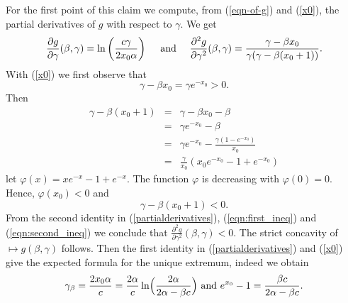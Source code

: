 \documentclass[aop,noinfoline]{imsart}
\renewcommand{\Box}{{\vrule width0.6ex height1em depth0cm}}
\newenvironment{proof}{\noindent{\bf Proof:}}{\hfill \Box}
\begin{document}
\begin{proof} 
 For the first point of this claim we compute, from (\ref{eqn-of-g}) and (\ref{x0}), the partial derivatives of $g$ with respect to $\gamma$. We get
  \begin{equation}\label{partialderivatives}
  \frac{ \partial g}{\partial\gamma}(\beta, \gamma) =
    \ln\left ( \frac{c\gamma}{2x_0\alpha}\right )\quad  \hbox{ and  } \quad  \frac{ \partial^2 g}{\partial\gamma^2} (\beta, \gamma)=
     \frac{\gamma-\beta x_0}{\gamma(\gamma - \beta(x_0+1))}.
     \end{equation}
      With  (\ref{x0}) we  first   observe that  
      \begin{equation}\label{eqn:first_ineq} \gamma-\beta
x_0=\gamma e^{-x_0}>0.
\end{equation}
Then
\begin{eqnarray*}
  \gamma-\beta (x_0+1) &=& \gamma-\beta x_0 - \beta \\
 \  &=& \gamma e^{-x_0} -\beta \\
  \  &=&  \gamma e^{-x_0} - \frac{\gamma (1-e^{-x_0})}{x_0} \\
  \  &=& \frac{\gamma}{x_0}(x_0e^{-x_0} -1+ e^{-x_0})
\end{eqnarray*}
let $\varphi(x)= xe^{-x} -1+ e^{-x}$. The function $\varphi$ is
decreasing with $\varphi(0)=0$. Hence, $\varphi(x_0)<0$ and
\begin{equation}\label{eqn:second_ineq}
     \gamma-\beta (x_0+1) <0.
\end{equation}
From the second identity in (\ref{partialderivatives}), (\ref{eqn:first_ineq}) and (\ref{eqn:second_ineq}) we conclude that $\displaystyle \frac{ \partial^2
g}{\partial\gamma^2} (\beta, \gamma)<0$. The  strict concavity of $\mapsto g(\beta, \gamma)$ follows.
Then the first identity in (\ref{partialderivatives}) and  (\ref{x0}) give the expected formula for the unique extremum, indeed we obtain 
 \begin{equation}\label{gammabeta}
     \gamma_{\beta} =\frac{2x_0 \alpha}{c}= \frac{2\alpha}{c}\ln \Bigl ( \frac{ 2\alpha}{2\alpha - \beta c}\Bigr )\hbox{ and } e^{x_0} -1 = \frac{\beta c}{2\alpha - \beta c}.
\end{equation} 

\medskip


\end{proof}
\end{document}
